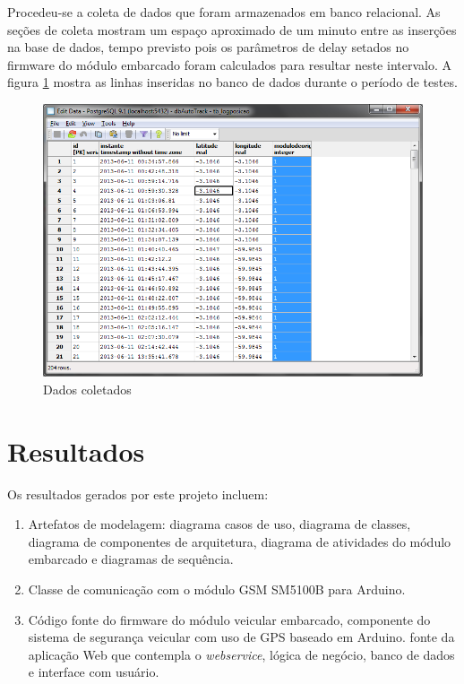 Procedeu-se a coleta de dados que foram armazenados em banco relacional. As seções de coleta mostram um espaço aproximado de um minuto entre as inserções na base de dados, tempo previsto pois os parâmetros de delay setados no firmware do módulo embarcado foram calculados para resultar neste intervalo. A figura \ref{fig:dadoscoletados} mostra as linhas inseridas no banco de dados durante o período de testes.

\begin{figure}[!htb]
	\centering
	\includegraphics[width=\textwidth]{figures/dados_coletados.png}
	\caption{Dados coletados}
	\label{fig:dadoscoletados}
\end{figure}


\section{Resultados}

Os resultados gerados por este projeto incluem:

\begin{enumerate}
	\item Artefatos de modelagem: diagrama casos de uso, diagrama de classes, diagrama de componentes de arquitetura, diagrama de atividades do módulo embarcado e diagramas de sequência.
	\item Classe de comunicação com o módulo GSM SM5100B para Arduino.
	\item Código fonte do firmware do módulo veicular embarcado, componente do sistema de segurança veicular com uso de GPS baseado em Arduino.
	 fonte da aplicação Web que contempla o \textit{webservice}, lógica de negócio, banco de dados e interface com usuário. 
\end{enumerate}

